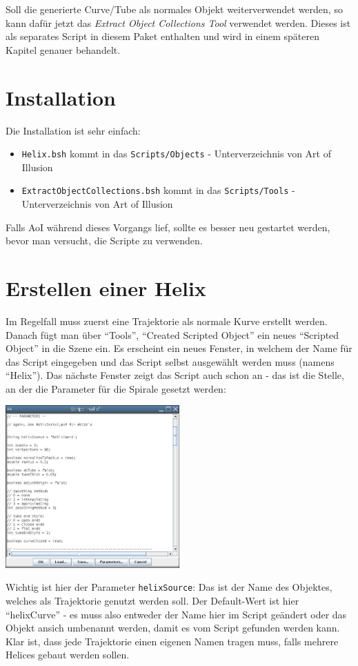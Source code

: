 \documentclass[12pt,a4paper]{scrartcl}
\begin{document}
Soll die generierte Curve/Tube als normales Objekt weiterverwendet
werden, so kann dafür jetzt das \emph{Extract Object Collections Tool}
verwendet werden. Dieses ist als separates Script in diesem Paket
enthalten und wird in einem späteren Kapitel genauer behandelt.

\section{Installation}
Die Installation ist sehr einfach:
\begin{itemize}
	\item \texttt{Helix.bsh} kommt in das \texttt{Scripts/Objects} -
	Unterverzeichnis von Art of Illusion
	\item \texttt{ExtractObjectCollections.bsh} kommt in das
	\texttt{Scripts/Tools} - Unterverzeichnis von Art of Illusion
\end{itemize}
Falls AoI während dieses Vorgangs lief, sollte es besser neu gestartet
werden, bevor man versucht, die Scripte zu verwenden.

\section{Erstellen einer Helix}
Im Regelfall muss zuerst eine Trajektorie als normale Kurve erstellt
werden. Danach fügt man über ``Tools'', ``Created Scripted Object''
ein neues ``Scripted Object'' in die Szene ein. Es erscheint ein
neues Fenster, in welchem der Name für das Script eingegeben und das
Script selbst ausgewählt werden muss (namens ``Helix''). Das nächste
Fenster zeigt das Script auch schon an - das ist die Stelle, an der die
Parameter für die Spirale gesetzt werden:
\begin{center}
	\includegraphics[width=0.5\textwidth]{../pics/createSO.jpg}
\end{center}
Wichtig ist hier der Parameter \texttt{helixSource}: Das ist der Name
des Objektes, welches als Trajektorie genutzt werden soll. Der
Default-Wert ist hier ``helixCurve'' - es muss also entweder der Name
hier im Script geändert oder das Objekt ansich umbenannt werden, damit
es vom Script gefunden werden kann. Klar ist, dass jede Trajektorie
einen eigenen Namen tragen muss, falls mehrere Helices gebaut werden
sollen.
\end{document}
